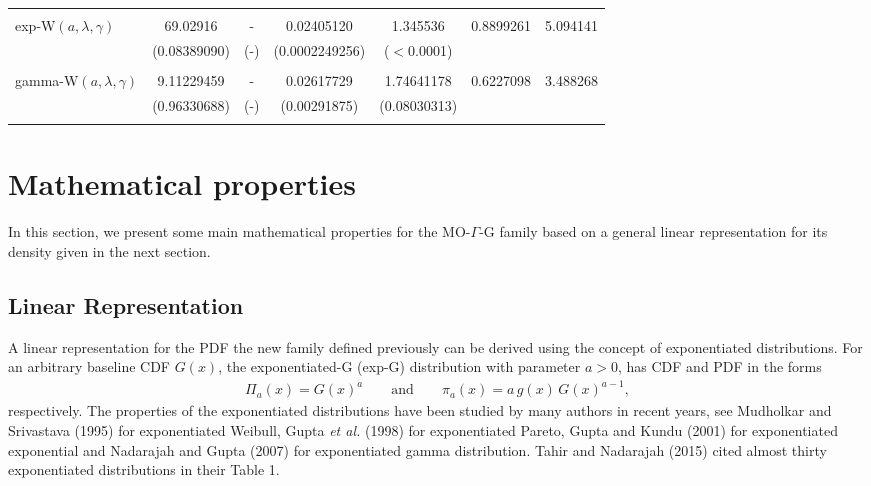 \documentclass[12pt,a4paper]{article} %
\begin{document}
\begin{table}[htb!]
\begin{tabular}{lcccccc}
 & & & & &  \\
 exp-W$(a,\lambda,\gamma)$   &    69.02916  & - &   0.02405120 & 1.345536 &   0.8899261   & 5.094141 \\
                          &   (0.08389090) & (-) & (0.0002249256) & ($<$0.0001)   &  & \\
                          
 & & & & &  \\
 gamma-W$(a,\lambda,\gamma)$    & 9.11229459   & - &  0.02617729 & 1.74641178 &    0.6227098 & 3.488268  \\ 
                             &  (0.96330688)&  (-)&  (0.00291875) & (0.08030313)     &  & \\
                             
 & & & & &  \\




                                                    \hline
\end{tabular}
\end{table}

\section{Mathematical properties}\label{properties}


In this section, we present some main mathematical properties for the MO-$\Gamma$-G family
based on a general linear representation for its density given in the next section.

\subsection{Linear Representation}


A linear representation for the PDF the new family defined previously
can be derived using the concept of exponentiated distributions.
For an arbitrary baseline CDF $G(x)$, the exponentiated-G (exp-G)
distribution with parameter $a>0$, has CDF and PDF in the forms
\begin{eqnarray*}
\Pi_a(x)=G(x)^a\qquad\text{and}\qquad\pi_a(x)=a\,g(x)\,G(x)^{a-1},
\end{eqnarray*}
respectively. The properties of the exponentiated distributions have been studied
by many authors in recent years, see Mudholkar and Srivastava (1995) for exponentiated
Weibull, Gupta {\it et al.} (1998) for exponentiated Pareto, Gupta and
Kundu (2001) for exponentiated exponential and Nadarajah and Gupta (2007)
for exponentiated gamma distribution. Tahir and Nadarajah (2015) cited almost
thirty exponentiated distributions in their Table 1.
\end{document}
